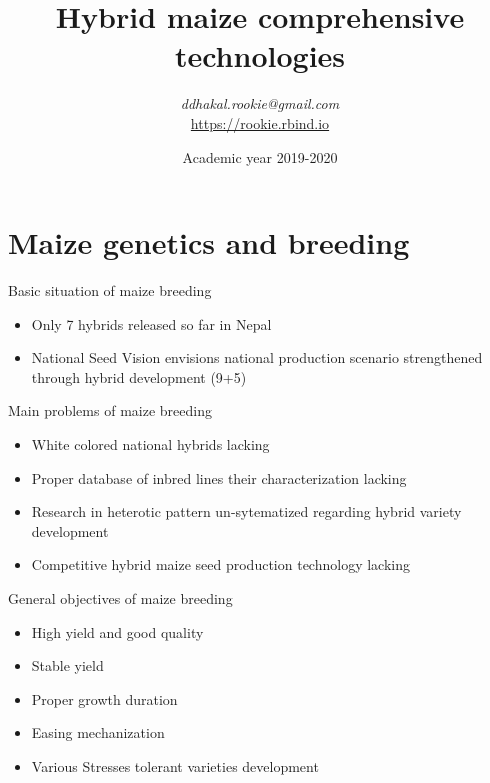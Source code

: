 \documentclass[11pt,dvipsnames,ignorenonframetext,aspectratio=169]{beamer}
\title[]{Hybrid maize comprehensive technologies}
\author[
        \textit{ddhakal.rookie@gmail.com}\\
\url{https://rookie.rbind.io}
    ]{\textit{ddhakal.rookie@gmail.com}\\
\url{https://rookie.rbind.io}}
\date[
      Academic year 2019-2020
  ]{
      Academic year 2019-2020
        }
\providecommand{\tightlist}{%
  \setlength{\itemsep}{0pt}\setlength{\parskip}{0pt}}
\begin{document}
  \begin{frame}[plain]
  \titlepage
  \end{frame}



\hypertarget{maize-genetics-and-breeding}{%
\section{Maize genetics and
breeding}\label{maize-genetics-and-breeding}}

\begin{frame}{Basic situation of maize breeding}
\protect\hypertarget{basic-situation-of-maize-breeding}{}

\begin{itemize}
\tightlist
\item
  Only 7 hybrids released so far in Nepal
\item
  National Seed Vision envisions national production scenario
  strengthened through hybrid development (9+5)
\end{itemize}

\end{frame}

\begin{frame}{Main problems of maize breeding}
\protect\hypertarget{main-problems-of-maize-breeding}{}

\begin{itemize}
\tightlist
\item
  White colored national hybrids lacking
\item
  Proper database of inbred lines their characterization lacking
\item
  Research in heterotic pattern un-sytematized regarding hybrid variety
  development
\item
  Competitive hybrid maize seed production technology lacking
\end{itemize}

\end{frame}

\begin{frame}{General objectives of maize breeding}
\protect\hypertarget{general-objectives-of-maize-breeding}{}

\begin{itemize}
\tightlist
\item
  High yield and good quality
\item
  Stable yield
\item
  Proper growth duration
\item
  Easing mechanization
\item
  Various Stresses tolerant varieties development
\end{itemize}

\end{frame}
\end{document}
